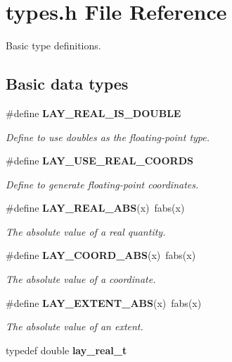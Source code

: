 \section{types.h File Reference}
\label{types_8h}
Basic type definitions.  


\subsection*{Basic data types}
\begin{CompactItemize}
\item 
\#define {\bf LAY\_\-REAL\_\-IS\_\-DOUBLE}\label{types_8h_a0}

\begin{CompactList}\small\item\em Define to use doubles as the floating-point type. \item\end{CompactList}\item 
\#define {\bf LAY\_\-USE\_\-REAL\_\-COORDS}\label{types_8h_a1}

\begin{CompactList}\small\item\em Define to generate floating-point coordinates. \item\end{CompactList}\item 
\#define {\bf LAY\_\-REAL\_\-ABS}(x)\ fabs(x)\label{types_8h_a2}

\begin{CompactList}\small\item\em The absolute value of a real quantity. \item\end{CompactList}\item 
\#define {\bf LAY\_\-COORD\_\-ABS}(x)\ fabs(x)\label{types_8h_a3}

\begin{CompactList}\small\item\em The absolute value of a coordinate. \item\end{CompactList}\item 
\#define {\bf LAY\_\-EXTENT\_\-ABS}(x)\ fabs(x)\label{types_8h_a4}

\begin{CompactList}\small\item\em The absolute value of an extent. \item\end{CompactList}\item 
typedef double {\bf lay\_\-real\_\-t}\label{types_8h_a5}


\end{CompactItemize}
